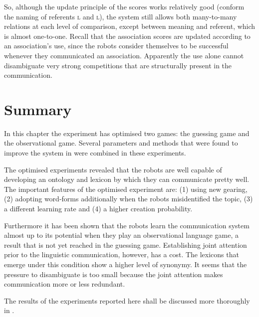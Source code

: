 So, although the update principle of the scores works relatively good (conform the naming of referents \textsc{l} and \textsc{l}), the system still allows both many-to-many relations at each level of comparison, except between meaning and referent, which is almost one-to-one. Recall that the association scores are updated according to an association's use, since the robots consider themselves to be successful whenever they communicated an association. Apparently the use alone cannot disambiguate very strong competitions that are structurally present in the communication.

\section{Summary}

In this chapter the experiment has optimised two games: the guessing game and the observational game. Several parameters and methods that were found to improve the system in  were combined in these experiments.

The optimised experiments revealed that the robots are well capable of developing an ontology and lexicon by which they can communicate pretty well. The important features of the optimised experiment are: (1) using new gearing, (2) adopting word-forms additionally when the robots misidentified the topic, (3) a different learning rate and (4) a higher creation probability. 

Furthermore it has been shown that the robots learn the communication system almost up to its potential when they play an observational language game, a result that is not yet reached in the guessing game. 
\newpage
Establishing joint attention prior to the linguistic communication, however, has a cost. The lexicons that emerge under this condition show a higher level of synonymy. It seems that the pressure to disambiguate is too small because the joint attention makes communication more or less redundant. 

The results of the experiments reported here shall be discussed more thoroughly in .